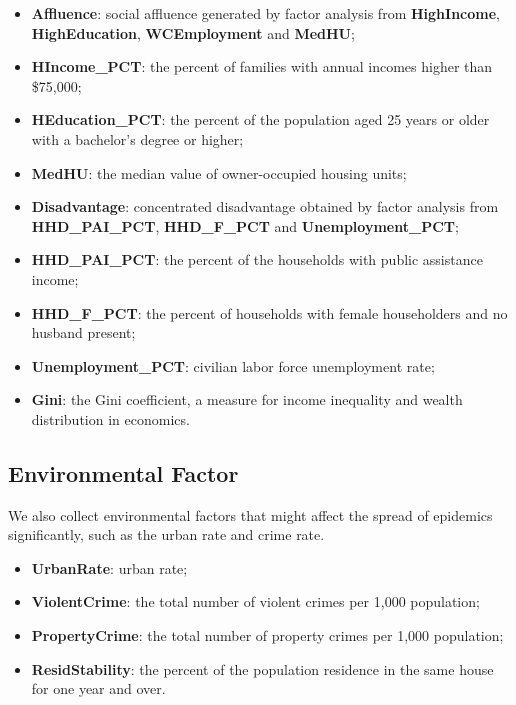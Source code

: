 \documentclass[]{book}
\begin{document}
\begin{itemize}
\item
  \textbf{Affluence}: social affluence generated by factor analysis from
  \textbf{HighIncome}, \textbf{HighEducation}, \textbf{WCEmployment} and
  \textbf{MedHU};
\item
  \textbf{HIncome\_PCT}: the percent of families with annual incomes
  higher than \$75,000;
\item
  \textbf{HEducation\_PCT}: the percent of the population aged 25 years
  or older with a bachelor's degree or higher;
\item
  \textbf{MedHU}: the median value of owner-occupied housing units;
\item
  \textbf{Disadvantage}: concentrated disadvantage obtained by factor
  analysis from \textbf{HHD\_PAI\_PCT}, \textbf{HHD\_F\_PCT} and
  \textbf{Unemployment\_PCT};
\item
  \textbf{HHD\_PAI\_PCT}: the percent of the households with public
  assistance income;
\item
  \textbf{HHD\_F\_PCT}: the percent of households with female
  householders and no husband present;
\item
  \textbf{Unemployment\_PCT}: civilian labor force unemployment rate;
\item
  \textbf{Gini}: the Gini coefficient, a measure for income inequality
  and wealth distribution in economics.
\end{itemize}

\subsection{Environmental Factor}\label{environmental-factor}

We also collect environmental factors that might affect the spread of
epidemics significantly, such as the urban rate and crime rate.

\begin{itemize}
\item
  \textbf{UrbanRate}: urban rate;
\item
  \textbf{ViolentCrime}: the total number of violent crimes per 1,000
  population;
\item
  \textbf{PropertyCrime}: the total number of property crimes per 1,000
  population;
\item
  \textbf{ResidStability}: the percent of the population residence in
  the same house for one year and over.
\end{itemize}
\end{document}
